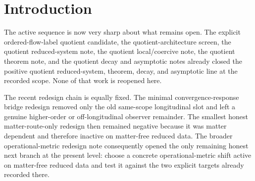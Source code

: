 \documentclass[11pt]{article}
\newcommand{\SigmaOpStar}{\Sigma^{\mathrm{op}}_\star}
\newcommand{\ReLong}{\widetilde{\mathcal R}_{\mu\nu}^{(\chi,\ge 3)}}
\newcommand{\EinQuad}{\mathcal Q_{\ge 2}^{\mathrm{Ein}}}
\begin{document}
\begin{abstract}
Target 2 also fails for this candidate. Because no explicit higher-order longitudinal completion is added, the only longitudinal contribution produced by the candidate beyond the already-recorded bridge remainder is the nonlinear Einstein term \(\EinQuad[\SigmaOpStar]\), which starts at quartic order. The redesigned-bridge note already isolates the surviving longitudinal remainder \(\ReLong\) as a genuinely higher-order sector generated by the nonlinear \(\vartheta-K\) relation, the nonlinear longitudinal slice source, and the nonlinear metric dependence of the eliminated longitudinal functional, all starting at cubic order. The present candidate therefore contributes no cubic longitudinal counterterm and supplies no new gauge/constraint-exact representation of that sector.

Accordingly, the first explicit local operational-metric stress-lift candidate is negative: it does not cancel the matter-free off-longitudinal \(Q/W\) remainder and it does not resolve the higher-order longitudinal remainder. At the current disciplined scope, that negative verdict shifts the next live burden away from further PDE reopening or further matter-route-only repairs and toward a deeper bridge-map redesign.
\end{abstract}

\section{Introduction}

The active sequence is now very sharp about what remains open. The explicit ordered-flow-label quotient candidate, the quotient-architecture screen, the quotient reduced-system note, the quotient local/coercive note, the quotient theorem note, and the quotient decay and asymptotic notes already closed the positive quotient reduced-system, theorem, decay, and asymptotic line at the recorded scope. None of that work is reopened here.

The recent redesign chain is equally fixed. The minimal convergence-response bridge redesign removed only the old same-scope longitudinal slot and left a genuine higher-order or off-longitudinal observer remainder. The smallest honest matter-route-only redesign then remained negative because it was matter dependent and therefore inactive on matter-free reduced data. The broader operational-metric redesign note consequently opened the only remaining honest next branch at the present level: choose a concrete operational-metric shift active on matter-free reduced data and test it against the two explicit targets already recorded there.
\end{document}
